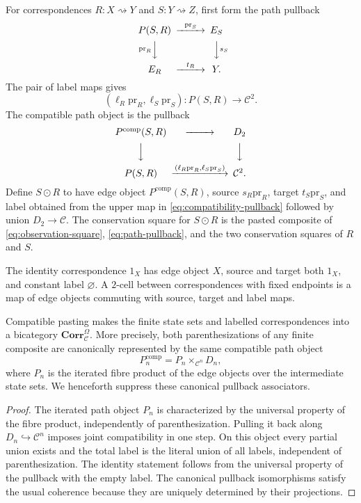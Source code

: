 For correspondences $R:X\rightsquigarrow Y$ and $S:Y\rightsquigarrow Z$, first form the path pullback
\begin{equation}\label{eq:path-pullback}
\begin{CD}
P(S,R) @>{\mathrm{pr}_S}>> E_S\\
@V{\mathrm{pr}_R}VV @VV{s_S}V\\
E_R @>{t_R}>> Y.
\end{CD}
\end{equation}
The pair of label maps gives
\[
(\ell_R\mathrm{pr}_R,\ell_S\mathrm{pr}_S):P(S,R)\longrightarrow\mathcal C^2.
\]
The compatible path object is the pullback
\begin{equation}\label{eq:compatibility-pullback}
\begin{CD}
P^{\mathrm{comp}}(S,R) @>>> D_2\\
@VVV @VVV\\
P(S,R) @>{(\ell_R\mathrm{pr}_R,\ell_S\mathrm{pr}_S)}>> \mathcal C^2.
\end{CD}
\end{equation}
Define $S\odot R$ to have edge object $P^{\mathrm{comp}}(S,R)$, source $s_R\mathrm{pr}_R$, target $t_S\mathrm{pr}_S$, and label obtained from the upper map in \eqref{eq:compatibility-pullback} followed by union $D_2\to\mathcal C$.  The conservation square for $S\odot R$ is the pasted composite of \eqref{eq:observation-square}, \eqref{eq:path-pullback}, and the two conservation squares of $R$ and $S$.

The identity correspondence $1_X$ has edge object $X$, source and target both $1_X$, and constant label $\varnothing$.  A $2$-cell between correspondences with fixed endpoints is a map of edge objects commuting with source, target and label maps.

\begin{lemma}\label{lem:labelled-relation-category}
Compatible pasting makes the finite state sets and labelled correspondences into a bicategory $\mathbf{Corr}_{\mathcal C}^{\Omega}$.  More precisely, both parenthesizations of any finite composite are canonically represented by the same compatible path object
\[
P_n^{\mathrm{comp}}
=
P_n\times_{\mathcal C^n}D_n,
\]
where $P_n$ is the iterated fibre product of the edge objects over the intermediate state sets.  We henceforth suppress these canonical pullback associators.
\end{lemma}

\begin{proof}
The iterated path object $P_n$ is characterized by the universal property of the fibre product, independently of parenthesization.  Pulling it back along $D_n\hookrightarrow\mathcal C^n$ imposes joint compatibility in one step.  On this object every partial union exists and the total label is the literal union of all labels, independent of parenthesization.  The identity statement follows from the universal property of the pullback with the empty label.  The canonical pullback isomorphisms satisfy the usual coherence because they are uniquely determined by their projections.
\end{proof}

